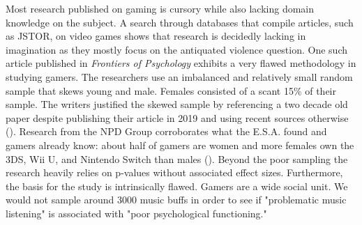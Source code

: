 \documentclass[12pt, a4paper]{article}
\begin{document}
Most research published on gaming is cursory while also lacking domain knowledge on the subject. A search through databases that compile articles, such as JSTOR, on video games shows that research is decidedly lacking in imagination as they mostly focus on the antiquated violence question. One such article published in \textit{Frontiers of Psychology} exhibits a very flawed methodology in studying gamers. The researchers use an imbalanced and relatively small random sample that skews young and male. Females consisted of a scant 15\% of their sample. The writers justified the skewed sample by referencing a two decade old paper despite publishing their article in 2019 and using recent sources otherwise (\cite{badresearch}). Research from the NPD Group corroborates what the E.S.A. found and gamers already know: about half of gamers are women and more females own the 3DS, Wii U, and Nintendo Switch than males (\cite{npdgamers}). Beyond the poor sampling the research heavily relies on p-values without associated effect sizes. Furthermore, the basis for the study is intrinsically flawed. Gamers are a wide social unit. We would not sample around 3000 music buffs in order to see if "problematic music listening" is associated with "poor psychological functioning."
\end{document}
